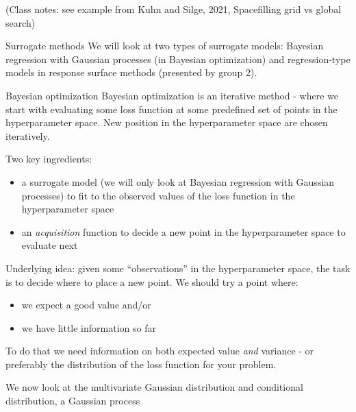 \documentclass[
  ignorenonframetext,
]{beamer}
\providecommand{\tightlist}{%
  \setlength{\itemsep}{0pt}\setlength{\parskip}{0pt}}
\begin{document}
\begin{frame}
(Class notes: see example from Kuhn and Silge, 2021, Spacefilling grid
vs global search)
\end{frame}

\begin{frame}
\begin{block}{Surrogate methods}
\protect\hypertarget{surrogate-methods}{}
We will look at two types of surrogate models: Bayesian regression with
Gaussian processes (in Bayesian optimization) and regression-type models
in response surface methods (presented by group 2).
\end{block}

\begin{block}{Bayesian optimization}
\protect\hypertarget{bayesian-optimization}{}
Bayesian optimization is an iterative method - where we start with
evaluating some loss function at some predefined set of points in the
hyperparameter space. New position in the hyperparameter space are
chosen iteratively.

Two key ingredients:

\begin{itemize}
\tightlist
\item
  a surrogate model (we will only look at Bayesian regression with
  Gaussian processes) to fit to the observed values of the loss function
  in the hyperparameter space
\item
  an \emph{acquisition} function to decide a new point in the
  hyperparameter space to evaluate next
\end{itemize}
\end{block}
\end{frame}

\begin{frame}
Underlying idea: given some ``observations'' in the hyperparameter
space, the task is to decide where to place a new point. We should try a
point where:

\begin{itemize}
\tightlist
\item
  we expect a good value and/or
\item
  we have little information so far
\end{itemize}

To do that we need information on both expected value \emph{and}
variance - or preferably the distribution of the loss function for your
problem.

We now look at the multivariate Gaussian distribution and conditional
distribution, a Gaussian process
\end{frame}
\end{document}
